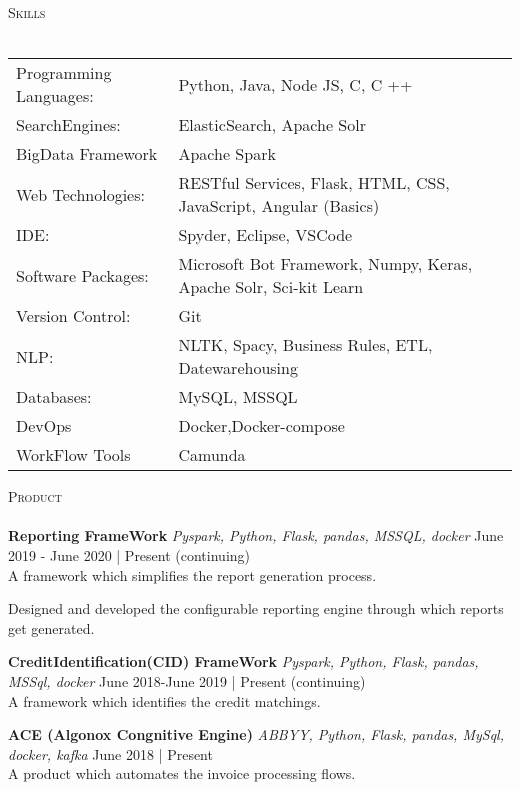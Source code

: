 \documentclass[a4paper]{article}
\newcommand{\lineunder} {
    \vspace*{-8pt} \\
    \hspace*{-18pt} \hrulefill \\
}
\newcommand{\header} [1] {
    {\hspace*{-18pt}\vspace*{6pt} \textsc{#1}}
    \vspace*{-6pt} \lineunder
}
\begin{document}
\header{Skills}
\begin{tabular}{ l l }
	Programming Languages: & Python, Java, Node JS, C, C ++                                    \\
	SearchEngines:         & ElasticSearch, Apache Solr                                        \\
    BigData Framework      & Apache Spark                                                      \\
    Web Technologies:      & RESTful Services, Flask, HTML, CSS, JavaScript, Angular (Basics)                \\
	IDE:                   & Spyder, Eclipse, VSCode                                           \\
	Software Packages:     & Microsoft Bot Framework, Numpy, Keras, Apache Solr, Sci-kit Learn \\
	Version Control:       & Git                                                               \\
	NLP:         & NLTK, Spacy, Business Rules, ETL, Datewarehousing \\
	Databases:   & MySQL, MSSQL \\
	DevOps  & Docker,Docker-compose \\
    WorkFlow Tools &Camunda \\

\end{tabular}
\vspace{2mm}

\header{Product}
{\textbf{Reporting FrameWork}} {\sl Pyspark, Python, Flask, pandas, MSSQL, docker} \hfill June 2019 - June 2020 | Present (continuing)\\
A framework which simplifies the report generation process.\\
\item Designed and developed the configurable reporting engine through which reports get generated.

{\textbf{CreditIdentification(CID) FrameWork}} {\sl Pyspark, Python, Flask, pandas, MSSql, docker} \hfill June 2018-June 2019 | Present (continuing)\\
A framework which identifies the credit matchings. 

{\textbf{ACE (Algonox Congnitive Engine)}} {\sl ABBYY, Python, Flask, pandas, MySql, docker, kafka} \hfill June 2018 | Present\\
A product which automates the invoice processing flows.\\
\end{document}
